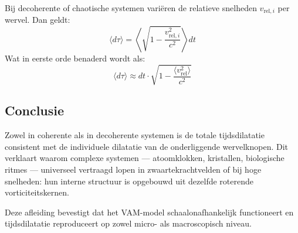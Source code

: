 Bij decoherente of chaotische systemen variëren de relatieve snelheden \( v_{\text{rel}, i} \) per wervel. Dan geldt:
\begin{equation}
    \langle d\tau \rangle = \left\langle \sqrt{1 - \frac{v_{\text{rel}, i}^2}{c^2}} \right\rangle dt
\end{equation}
Wat in eerste orde benaderd wordt als:
\begin{equation}
    \langle d\tau \rangle \approx dt \cdot \sqrt{1 - \frac{\langle v_{\text{rel}}^2 \rangle}{c^2}} \label{eq:average_dil}
\end{equation}

\subsection*{Conclusie}

Zowel in coherente als in decoherente systemen is de totale tijdsdilatatie consistent met de individuele dilatatie van de onderliggende wervelknopen. Dit verklaart waarom complexe systemen — atoomklokken, kristallen, biologische ritmes — universeel vertraagd lopen in zwaartekrachtvelden of bij hoge snelheden: hun interne structuur is opgebouwd uit dezelfde roterende vorticiteitskernen.

\vspace{1em}
\noindent
Deze afleiding bevestigt dat het VAM-model schaalonafhankelijk functioneert en tijdsdilatatie reproduceert op zowel micro- als macroscopisch niveau.